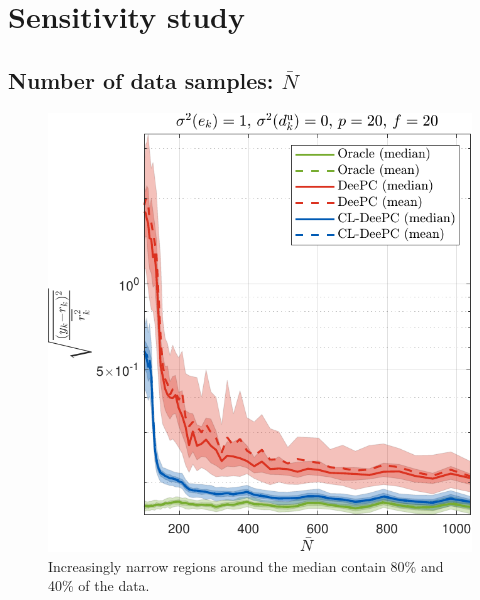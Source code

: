 \section{Sensitivity study}
\subsection{Number of data samples: $\bar{N}$}
\begin{figure}[b!]
\begin{center}
\includegraphics[width=\columnwidth]{results/figures/Varying_Nbar_99-1039-50_p_20_f_20_Re_1_Ru_1_Rdu_0_Q_100_R_0_dR_10.pdf}    %
\caption{Increasingly narrow regions around the median contain 80\% and 40\% of the data.}  %
\label{fig:varying_Nbar}                                 %
\end{center}                                 %
\end{figure}

